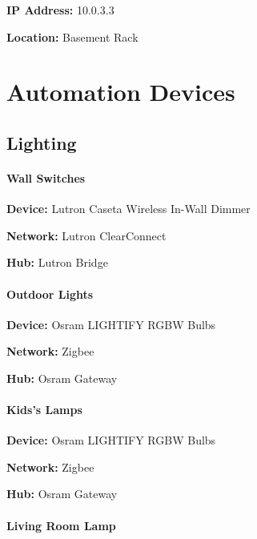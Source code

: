 \documentclass[]{article}
\let\oldparagraph\paragraph
\renewcommand{\paragraph}[1]{\oldparagraph{#1}\mbox{}}
\begin{document}
\textbf{IP Address: }
{10.0.3.3}

\textbf{Location: }
{Basement Rack}


\newpage

\vspace{\baselineskip}\section*{Automation Devices}

\subsection{\texorpdfstring{{Lighting}}{Lighting}}

\paragraph{\texorpdfstring{{Wall Switches}}{Wall Switches}}

\textbf{Device: }
{Lutron Caseta Wireless In-Wall Dimmer}

\textbf{Network: }
{Lutron ClearConnect}

\textbf{Hub: }
{Lutron Bridge}

\paragraph{\texorpdfstring{{Outdoor Lights}}{Outdoor Lights}}

\textbf{Device: }
{Osram LIGHTIFY RGBW Bulbs}

\textbf{Network: }
{Zigbee}

\textbf{Hub: }
{Osram Gateway}

\paragraph{\texorpdfstring{{Kids's Lamps}}{Kid's Lamps}}

\textbf{Device: }
{Osram LIGHTIFY RGBW Bulbs}

\textbf{Network: }
{Zigbee}

\textbf{Hub: }
{Osram Gateway}

\paragraph{\texorpdfstring{{Living Room Lamp}}{Living Room Lamp}}
\end{document}
